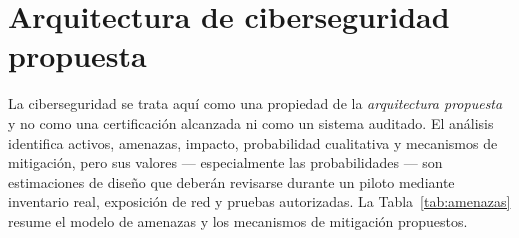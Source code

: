 \section{Arquitectura de ciberseguridad propuesta}\label{sec:ciberseguridad}

La ciberseguridad se trata aquí como una propiedad de la \emph{arquitectura propuesta} y no como
una certificación alcanzada ni como un sistema auditado. El análisis identifica activos,
amenazas, impacto, probabilidad cualitativa y mecanismos de mitigación, pero sus valores ---
especialmente las probabilidades --- son estimaciones de diseño que deberán revisarse durante un
piloto mediante inventario real, exposición de red y pruebas autorizadas. La
Tabla~\ref{tab:amenazas} resume el modelo de amenazas y los mecanismos de mitigación propuestos.

